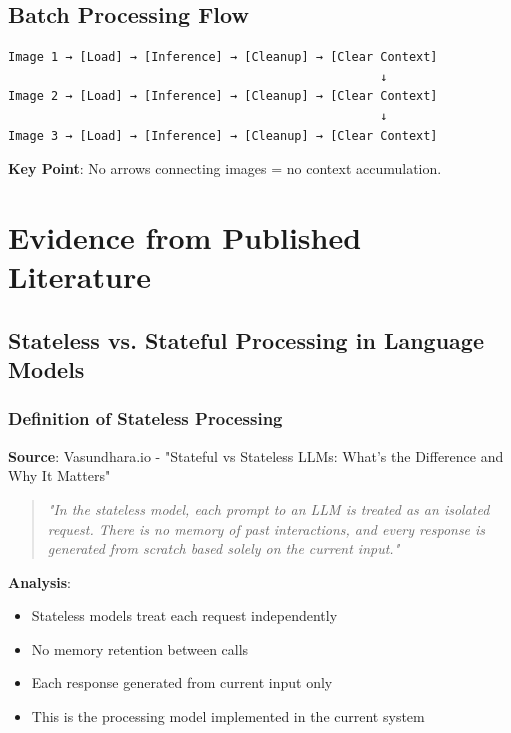 \documentclass[11pt,a4paper]{article}
\begin{document}
\subsection{Batch Processing Flow}

\begin{verbatim}
Image 1 → [Load] → [Inference] → [Cleanup] → [Clear Context]
                                                    ↓
Image 2 → [Load] → [Inference] → [Cleanup] → [Clear Context]
                                                    ↓
Image 3 → [Load] → [Inference] → [Cleanup] → [Clear Context]
\end{verbatim}

\textbf{Key Point}: No arrows connecting images = no context accumulation.

\section{Evidence from Published Literature}

\subsection{Stateless vs. Stateful Processing in Language Models}

\subsubsection{Definition of Stateless Processing}

\textbf{Source}: Vasundhara.io - "Stateful vs Stateless LLMs: What's the Difference and Why It Matters"

\begin{quote}
\textit{"In the stateless model, each prompt to an LLM is treated as an isolated request. There is no memory of past interactions, and every response is generated from scratch based solely on the current input."}
\end{quote}

\textbf{Analysis}:
\begin{itemize}[leftmargin=*]
    \item Stateless models treat each request independently
    \item No memory retention between calls
    \item Each response generated from current input only
    \item This is the processing model implemented in the current system
\end{itemize}
\end{document}
